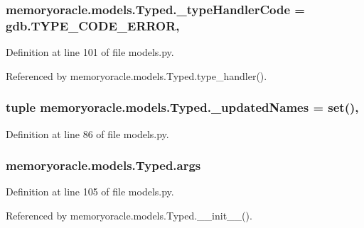 \subsubsection[{\+\_\+type\+Handler\+Code}]{\setlength{\rightskip}{0pt plus 5cm}memoryoracle.\+models.\+Typed.\+\_\+type\+Handler\+Code = gdb.\+T\+Y\+P\+E\+\_\+\+C\+O\+D\+E\+\_\+\+E\+R\+R\+O\+R\hspace{0.3cm}{\ttfamily [static]}, {\ttfamily [private]}}\label{classmemoryoracle_1_1models_1_1Typed_a66ecd94bdf4d37ff1f2344da498dc71d}


Definition at line 101 of file models.\+py.



Referenced by memoryoracle.\+models.\+Typed.\+type\+\_\+handler().

\hypertarget{classmemoryoracle_1_1models_1_1Typed_a5361312e774368ff43e4ac0ef8db61f0}{}
\subsubsection[{\+\_\+updated\+Names}]{\setlength{\rightskip}{0pt plus 5cm}tuple memoryoracle.\+models.\+Typed.\+\_\+updated\+Names = set()\hspace{0.3cm}{\ttfamily [static]}, {\ttfamily [private]}}\label{classmemoryoracle_1_1models_1_1Typed_a5361312e774368ff43e4ac0ef8db61f0}


Definition at line 86 of file models.\+py.

\hypertarget{classmemoryoracle_1_1models_1_1Typed_a81616ab75a5a3b89f9707d0342033614}{}
\subsubsection[{args}]{\setlength{\rightskip}{0pt plus 5cm}memoryoracle.\+models.\+Typed.\+args}\label{classmemoryoracle_1_1models_1_1Typed_a81616ab75a5a3b89f9707d0342033614}


Definition at line 105 of file models.\+py.



Referenced by memoryoracle.\+models.\+Typed.\+\_\+\+\_\+init\+\_\+\+\_\+().

